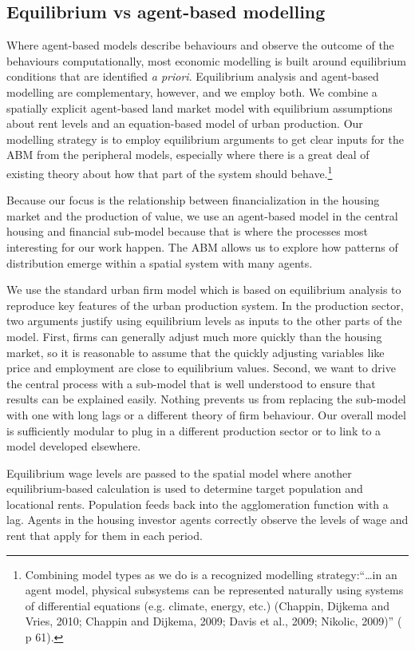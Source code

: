\subsection{Equilibrium vs agent-based modelling}
Where agent-based models describe behaviours and observe the outcome of the behaviours computationally, most economic modelling is built around equilibrium conditions that are identified \textit{a priori}. Equilibrium analysis and agent-based modelling are complementary, however, and we employ both. We combine a spatially explicit agent-based land market model with equilibrium assumptions about rent levels and an equation-based model of urban production. Our modelling strategy is to employ equilibrium arguments to get clear inputs for the \gls{ABM} from the peripheral models, especially where there is a great deal of existing theory about how that part of the system should behave.\footnote{Combining model types as we do is a recognized modelling strategy:``\dots in an agent model, physical subsystems can be represented naturally using systems of differential equations (e.g. climate, energy, etc.)  (Chappin, Dijkema and Vries, 2010; Chappin and Dijkema, 2009; Davis et al., 2009; Nikolic, 2009)''  (\cite{chappin_simulating_2011} p 61).} 

Because our focus is the relationship between financialization in the housing market and the production of value, we use an agent-based model in the central housing and financial sub-model because that is where the processes most interesting for our work happen. The ABM allows us to explore how patterns of distribution emerge within a spatial system with many agents.

We use the standard urban firm model which is based on equilibrium analysis to reproduce key features of the urban production system. In the production sector, two arguments justify using equilibrium levels as inputs to the other parts of the model. First, firms can generally adjust much more quickly than the housing market, so it is reasonable to assume that the quickly adjusting variables like price and employment are close to equilibrium values.  Second, we want to drive the central process with a sub-model that is well understood to ensure that results can be explained easily. Nothing prevents us from replacing the sub-model with one with long lags or a different theory of firm behaviour. Our overall model is sufficiently modular to plug in a different production sector or to link to a model developed elsewhere.

Equilibrium wage levels are passed to the spatial model where another equilibrium-based calculation is used to determine target population and locational rents. Population feeds back into the agglomeration function with a lag. Agents in the housing investor agents correctly observe the levels of wage and rent that apply for them in each period. 

